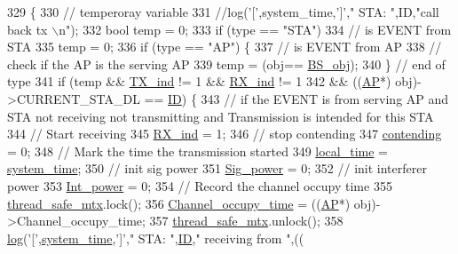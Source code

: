 \begin{DoxyCode}
329                                                \{
330     \textcolor{comment}{// temperoray variable}
331     \textcolor{comment}{//log('[',system\_time,']'," STA: ",ID,"call back tx \(\backslash\)n");}
332     \textcolor{keywordtype}{bool} temp = 0;
333     \textcolor{keywordflow}{if} (type == \textcolor{stringliteral}{"STA"})
334         \textcolor{comment}{// is EVENT from STA}
335         temp = 0;
336     \textcolor{keywordflow}{if} (type == \textcolor{stringliteral}{"AP"}) \{
337         \textcolor{comment}{// is EVENT from AP}
338         \textcolor{comment}{// check if the AP is the serving AP}
339         temp = (obj== \hyperlink{classSTA_abfa329ed1a4539a0f88ef568f41aaac9}{BS\_obj});
340     \} \textcolor{comment}{// end of type}
341     \textcolor{keywordflow}{if} (temp && \hyperlink{classSTA_a0ad8be1dec7b752e1be4f13e03faae4c}{TX\_ind} != 1 && \hyperlink{classSTA_aace6d664e5ecf495177277ef030141c6}{RX\_ind} != 1
342             && ((\hyperlink{classAP}{AP}*) obj)->CURRENT\_STA\_DL == \hyperlink{classSTA_a9376abb50969b5b16aeb5fb0e449e6f7}{ID}) \{
343         \textcolor{comment}{// if the EVENT is from serving AP and STA not receiving not transmitting and Transmission is
       intended for this STA}
344         \textcolor{comment}{// Start receiving}
345         \hyperlink{classSTA_aace6d664e5ecf495177277ef030141c6}{RX\_ind} = 1;
346         \textcolor{comment}{// stop contending                }
347         \hyperlink{classSTA_ad4226c80ad37062f9648438bce828089}{contending} = 0;
348         \textcolor{comment}{// Mark the time the transmission started}
349         \hyperlink{classSTA_ad4800b03ee83fe283cc33089eb438359}{local\_time} = \hyperlink{STA_8cpp_aaa03a568dc1d9d3391286ea24b9cfb63}{system\_time};
350         \textcolor{comment}{// init sig power}
351         \hyperlink{classSTA_aed9adbb07ca59c2efa1470e76180331c}{Sig\_power} = 0;
352         \textcolor{comment}{// init interferer power}
353         \hyperlink{classSTA_aa1e60f7391861b468314437fbad67280}{Int\_power} = 0;
354         \textcolor{comment}{// Record the channel occupy time}
355         \hyperlink{STA_8cpp_aaa6351021119738f7a064778438f782c}{thread\_safe\_mtx}.lock();
356         \hyperlink{classSTA_a409c7dfb7f0dd3688fdf655a36cdb9bc}{Channel\_occupy\_time} = ((\hyperlink{classAP}{AP}*) obj)->Channel\_occupy\_time;
357         \hyperlink{STA_8cpp_aaa6351021119738f7a064778438f782c}{thread\_safe\_mtx}.unlock();
358         \hyperlink{STA_8cpp_aa5af53510557e77a03906c5016ebe66f}{log}(\textcolor{charliteral}{'['},\hyperlink{STA_8cpp_aaa03a568dc1d9d3391286ea24b9cfb63}{system\_time},\textcolor{charliteral}{']'},\textcolor{stringliteral}{" STA: "},\hyperlink{classSTA_a9376abb50969b5b16aeb5fb0e449e6f7}{ID},\textcolor{stringliteral}{" receiving from "},((

\end{DoxyCode}
